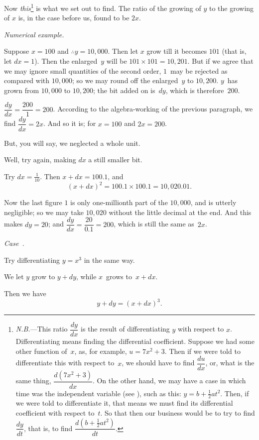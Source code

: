 \documentclass[12pt]{book}[2005/09/16]
\newcommand\Subsection[1]{%
  \medskip\pagebreak[1]\par\textit{#1}\pagebreak[0]\par%
}
\newcommand{\Case}[1]{\Subsection{Case~\upshape{#1}.}}
\newcommand{\DPPageSep}[2]{\Pagelabel{#2}}
\newcommand{\Pagelabel}[1]
  {\phantomsection\label{#1}}
\newcommand{\Pageref}[2][p.]{%
  \ifthenelse{\not\equal{#1}{}}{%
    \hyperref[#2]{#1~\pageref*{#2}}%
  }{%
    \hyperref[#2]{\pageref{*#2}}%
  }%
}
\newcommand{\NB}{\textit{N.B.}}
\begin{document}
Now \emph{this}\footnote
  {\NB---This ratio $\dfrac{dy}{dx}$ is the result of differentiating $y$ with
  respect to $x$. Differentiating means finding the differential coefficient.
  Suppose we had some other function of~$x$, as, for
  example, $u = 7x^2 + 3$. Then if we were told to differentiate this
  with respect to~$x$, we should have to find $\dfrac{du}{dx}$, or, what is the same
  thing, $\dfrac{d(7x^2 + 3)}{dx}$. On the other hand, we may have a case in which
  time was the independent variable (see \Pageref{indvar}), such as this:
  $y = b + \frac{1}{2} at^2$. Then, if we were told to differentiate it, that means we
  must find its differential coefficient with respect to~$t$. So that then
  our business would be to try to find $\dfrac{dy}{dt}$, that is, to find
  $\dfrac{d(b + \frac{1}{2} at^2)}{dt}$.}
is what we set out to find. The ratio of
the growing of $y$ to the growing of $x$ is, in the case
before us, found to be $2x$.
\DPPageSep{032.png}{20}%


\Subsection{Numerical example.}
Suppose $x=100$ and $\therefore y=10,000$. Then let $x$ grow
till it becomes $101$ (that is, let $dx=1$). Then the
enlarged~$y$ will be $101 × 101 = 10,201$. But if we agree
that we may ignore small quantities of the second
order, $1$~may be rejected as compared with $10,000$; so
we may round off the enlarged~$y$ to $10,200$. $y$~has
grown from $10,000$ to $10,200$; the bit added on is~$dy$,
which is therefore~$200$.

$\dfrac{dy}{dx} = \dfrac{200}{1} = 200$. According to the algebra-working
of the previous paragraph, we find $\dfrac{dy}{dx} = 2x$. And so
it is; for $x=100$ and $2x=200$.

But, you will say, we neglected a whole unit.

Well, try again, making $dx$ a still smaller bit.

Try $dx=\frac{1}{10}$. Then $x+dx=100.1$, and
\[
(x+dx)^2 = 100.1 × 100.1 = 10,020.01.
\]

Now the last figure $1$ is only one-millionth part of
the $10,000$, and is utterly negligible; so we may
take $10,020$ without the little decimal at the end.
And this makes $dy=20$; and $\dfrac{dy}{dx} = \dfrac{20}{0.1} = 200$, which
is still the same as~$2x$.

\Case{2}
Try differentiating $y = x^3$ in the same way.

We let $y$ grow to $y+dy$, while $x$~grows to~$x+dx$.

Then we have
\[
y + dy = (x + dx)^3.
\]
\DPPageSep{033.png}{21}%
\end{document}
